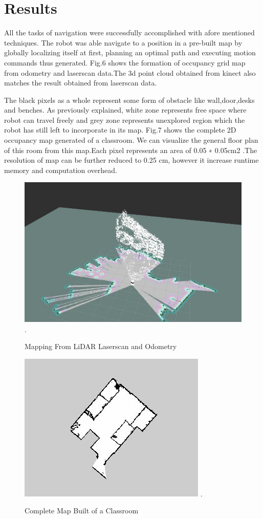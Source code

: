 \documentclass[journal,twoside]{IEEEtran}
\begin{document}
\section{Results}
\noindent All the tasks of navigation were successfully accomplished with afore mentioned techniques. The robot was able navigate to a position in a pre-built map by globally localizing itself at first, planning an optimal path and executing motion commands thus generated. Fig.6 shows the formation of occupancy grid map from odometry and laserscan data.The 3d point cloud obtained from kinect also matches the result obtained from laserscan data.
\par\noindent The black pixels as a whole represent some form of obstacle like wall,door,desks and benches. As previously explained, white zone represents free space where robot can travel freely and grey zone represents unexplored region which the robot has still left to incorporate in its map. Fig.7 shows the complete 2D occupancy map generated of a classroom. We can visualize the general floor plan of this room from this map.Each pixel represents an area of 0.05 ∗ 0.05cm2 .The resolution of map can be further reduced to 0.25 cm, however it increase runtime memory and computation overhead.
\begin{figure}[h!]
\centering
\includegraphics[scale=.27]{6.jpg}
\DeclareGraphicsExtensions.
\caption{Mapping From LiDAR Laserscan and Odometry}
\end{figure}
\begin{figure}[h!]
\centering
\includegraphics[scale=.73]{7.jpg}
\DeclareGraphicsExtensions.
\caption{Complete Map Built of a Classroom}
\end{figure}
\end{document}
